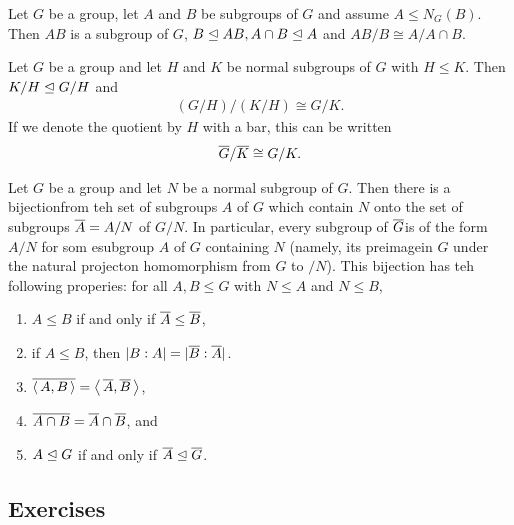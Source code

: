 \documentclass[10pt,a4paper]{report}
\begin{document}
\begin{theorem}  Let $G$ be a group, let $A$ and $B$ be subgroups of $G$ and assume $A \le N_G(B)$.  Then $AB$ is a subgroup of $G$, $B\trianglelefteq AB, A \cap B \trianglelefteq A$ and $AB/B\cong A/A\cap B$.

\end{theorem}

\begin{theorem}  Let $G$ be a group and let $H$ and $K$ be normal subgroups of $G$ with $H \le K$.  Then $K/H\trianglelefteq G/H$ and 
\begin{align*}
	(G/H)/(K/H)\cong G/K.
\end{align*}If we denote the quotient by $H$ with a bar, this can be written
\begin{align*}
	\overline{G}/\overline{K}\cong G/K.
\end{align*}

\end{theorem}

\begin{theorem}  Let $G$ be a group and let $N$ be a normal subgroup of $G$.  Then there is a bijectionfrom teh set of subgroups $A$ of $G$ which contain $N$ onto the set of subgroups $\overline{A}=A/N$ of $G/N$.  In particular, every subgroup of $\overline{G}$is of the form $A/N$ for som esubgroup $A$ of $G$ containing $N$ (namely, its preimagein $G$ under the natural projecton homomorphism from $G$ to $/N$).  This bijection has teh following properies: for all $A,B \le G$ with $N \le A$ and $N \le B$,
\begin{enumerate}
\item  $A\le B$ if and only if $\overline{A} \le \overline{B}$,
\item if $A \le B$, then $|B:A|=|\overline{B}:\overline{A}|$.
\item $\overline{\left \langle\, A,B \,\right \rangle} = \left \langle\, \overline{A},\overline{B} \,\right \rangle$,
\item $\overline{A\cap B} = \overline{A}\cap \overline{B}$, and
\item $A \trianglelefteq G$ if and only if $\overline{A}\trianglelefteq\overline{G}$.
\end{enumerate}

\end{theorem}

\subsection{Exercises}
\end{document}
